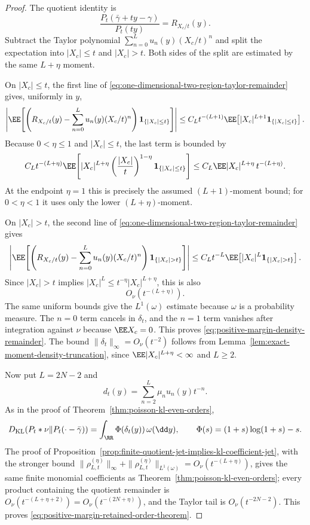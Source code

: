 \begin{proof}
The quotient identity is
\[
\frac{P_t(\bar{\gamma}+ty-\gamma)}{P_t(ty)}
=R_{X_c/t}(y).
\]
Subtract the Taylor polynomial
\(\sum_{n=0}^{L}u_n(y)(X_c/t)^n\) and split the expectation into
\(|X_c|\le t\) and \(|X_c|>t\).  Both sides of the split are estimated by the
same \(L+\eta\) moment.

On \(|X_c|\le t\), the first line of
\eqref{eq:one-dimensional-two-region-taylor-remainder} gives, uniformly in
\(y\),
\[
\left|
\EE\!\left[
\left(R_{X_c/t}(y)-\sum_{n=0}^{L}u_n(y)(X_c/t)^n\right)
\mathbf1_{\{|X_c|\le t\}}
\right]\right|
\le
C_Lt^{-(L+1)}
\EE\!\left[|X_c|^{L+1}\mathbf1_{\{|X_c|\le t\}}\right].
\]
Because \(0<\eta\le1\) and \(|X_c|\le t\), the last term is bounded by
\[
C_Lt^{-(L+\eta)}
\EE\!\left[
|X_c|^{L+\eta}
\left(\frac{|X_c|}{t}\right)^{1-\eta}
\mathbf1_{\{|X_c|\le t\}}
\right]
\le
C_L\EE|X_c|^{L+\eta}\,t^{-(L+\eta)} .
\]
At the endpoint \(\eta=1\) this is precisely the assumed
\((L+1)\)-moment bound; for \(0<\eta<1\) it uses only the lower
\((L+\eta)\)-moment.

On \(|X_c|>t\), the second line of
\eqref{eq:one-dimensional-two-region-taylor-remainder} gives
\[
\left|
\EE\!\left[
\left(R_{X_c/t}(y)-\sum_{n=0}^{L}u_n(y)(X_c/t)^n\right)
\mathbf1_{\{|X_c|>t\}}
\right]\right|
\le
C_Lt^{-L}\EE\!\left[|X_c|^L\mathbf1_{\{|X_c|>t\}}\right].
\]
Since \(|X_c|>t\) implies
\(|X_c|^L\le t^{-\eta}|X_c|^{L+\eta}\), this is also
\[
O_\nu(t^{-(L+\eta)}).
\]
The same uniform bounds give the \(L^1(\omega)\) estimate because
\(\omega\) is a probability measure.  The \(n=0\) term cancels in
\(\delta_t\), and the \(n=1\) term vanishes after integration against
\(\nu\) because \(\EE X_c=0\).  This proves
\eqref{eq:positive-margin-density-remainder}.  The bound
\(\|\delta_t\|_\infty=O_\nu(t^{-2})\) follows from
Lemma~\ref{lem:exact-moment-density-truncation}, since
\(\EE|X_c|^{L+\eta}<\infty\) and \(L\ge2\).

Now put \(L=2N-2\) and
\[
d_t(y)=\sum_{n=2}^{L}\mu_nu_n(y)t^{-n}.
\]
As in the proof of Theorem~\ref{thm:poisson-kl-even-orders},
\[
D_{\mathrm{KL}}(P_t*\nu\|P_t(\cdot-\bar{\gamma}))
=\int_{\RR}\Phi(\delta_t(y))\,\omega(\dd y),
\qquad
\Phi(s)=(1+s)\log(1+s)-s .
\]
The proof of
Proposition~\ref{prop:finite-quotient-jet-implies-kl-coefficient-jet}, with
the stronger bound
\(\|\rho_{L,t}^{(\eta)}\|_\infty+
\|\rho_{L,t}^{(\eta)}\|_{L^1(\omega)}
=O_\nu(t^{-(L+\eta)})\), gives the same finite monomial coefficients as
Theorem~\ref{thm:poisson-kl-even-orders}; every product containing the
quotient remainder is
\(O_\nu(t^{-(L+\eta+2)})=O_\nu(t^{-(2N+\eta)})\), and the Taylor tail is
\(O_\nu(t^{-2N-2})\).  This proves
\eqref{eq:positive-margin-retained-order-theorem}.
\end{proof}

